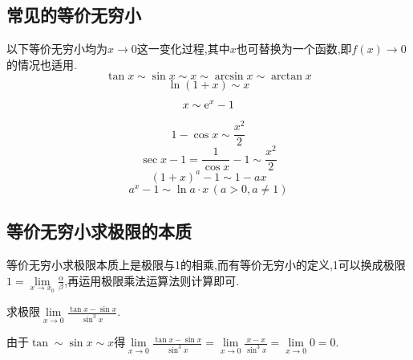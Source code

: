 \warn[
{\large \bf 0与``0"的区别}\vspace*{0.5em}\\
\hspace*{1em}(1)\quad ``0"指的是无穷小,设$\alpha$是某一变化过程中的无穷小,也就是说$x$趋于某一值时,极限为0.\vspace*{0.5em}\\
\hspace*{1em}(2)\quad 当0指的是实数0时,$\lim 0 \cdot f(x)=0$,这与$f(x)$无关,即使$\lim f(x)=\infty$,其结果仍然是0,因为0在这里是实数,而不是无穷小.
]


\subsection{常见的等价无穷小}
\ttheorem[常见的等价无穷小]
以下等价无穷小均为$x \to 0$这一变化过程,其中$x$也可替换为一个函数,即$f(x) \to 0$的情况也适用.
\begin{equation}
\tan x \sim \sin x \sim x \sim \arcsin x \sim \arctan x
\end{equation}
\begin{equation}
\ln (1+x) \sim x
\end{equation}
\begin{equation}
x \sim {\rm{e}}^x -1
\end{equation}
\begin{equation}
1-\cos x \sim \frac{x^2}{2}
\end{equation}
\begin{equation}
\sec x -1 =\frac{1}{\cos x}-1 \sim \frac{x^2}{2}
\end{equation}
\begin{equation}
(1+x)^a-1 \sim 1-ax
\end{equation}
\begin{equation}
a^x-1 \sim \ln a \cdot x \,(a>0,a \ne 1)
\end{equation}
\subsection{等价无穷小求极限的本质}
等价无穷小求极限本质上是极限与1的相乘,而有等价无穷小的定义,1可以换成极限$\displaystyle 1=\lim\limits_{x \to x_0}\frac{\alpha }{\beta}$,再运用极限乘法运算法则计算即可.

\example[等价无穷小的误用]\sj
\examples \label{例 1.8}求极限$\displaystyle \lim\limits_{x \to 0}\frac{\tan x -\sin x}{\sin^3 x}$.

\errsolve  由于$\tan \sim \sin x \sim x$得$\displaystyle \lim\limits_{x \to 0}\frac{\tan x -\sin x}{\sin^3 x}=\lim\limits_{x \to 0}\frac{x-x}{\sin^3 x}=\lim\limits_{x \to 0}0=0.$

